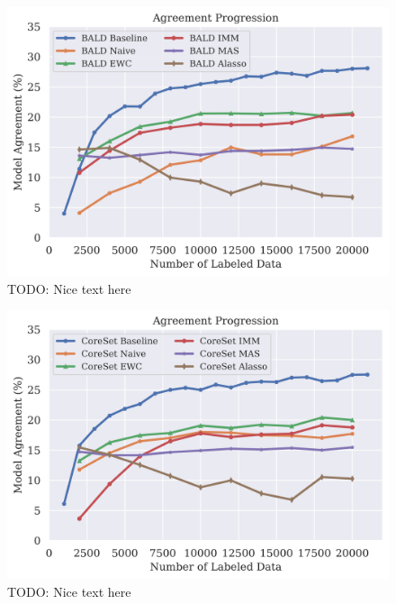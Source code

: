 \begin{figure}[h]
    \centering
    \includegraphics[width=0.8\linewidth]{images/results_CALMS/cifar100_softmax_bald.png}
    \caption[Agreement Comparison for Model Stealing on CIFAR100 using the softmax output and the Active Learning strategy BALD]{TODO: Nice text here}
    \label{fig:CALMSCIFAR100SoftmaxBALD}
\end{figure}

\begin{figure}[h]
    \centering
    \includegraphics[width=0.8\linewidth]{images/results_CALMS/cifar100_softmax_coreset.png}
    \caption[Agreement Comparison for Model Stealing on CIFAR100 using the softmax output and the Active Learning strategy CoreSet]{TODO: Nice text here}
    \label{fig:CALMSCIFAR100SoftmaxCoreSet}
\end{figure}

